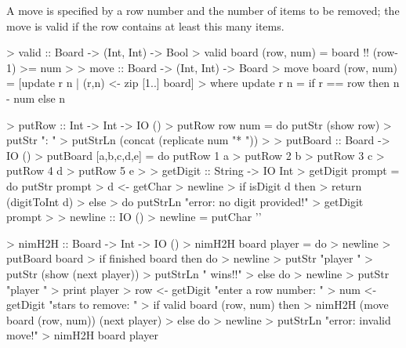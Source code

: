 \begin{impl}
A move is specified by a row number and the number of items to be removed; the move is valid if the row contains at least this many items.
\end{impl}
\begin{haskellcode}

> valid :: Board -> (Int, Int) -> Bool
> valid board (row, num) = board !! (row-1) >= num
> 
> move :: Board -> (Int, Int) -> Board
> move board (row, num) = [update r n | (r,n) <- zip [1..] board]
>      where update r n = if r == row then n - num else n

\end{haskellcode}

\begin{impl}
\end{impl}
\begin{haskellcode}

> putRow :: Int -> Int -> IO ()
> putRow row num = do putStr (show row)
>                     putStr ": "
>                     putStrLn (concat (replicate num "* "))
> 
> putBoard :: Board -> IO ()
> putBoard [a,b,c,d,e] = do putRow 1 a
>                           putRow 2 b
>                           putRow 3 c
>                           putRow 4 d
>                           putRow 5 e
> 
> getDigit :: String -> IO Int
> getDigit prompt = do putStr prompt
>                      d <- getChar
>                      newline
>                      if isDigit d then
>                         return (digitToInt d)
>                      else 
>                         do putStrLn "error: no digit provided!"
>                            getDigit prompt
> 
> newline :: IO ()
> newline = putChar '\n'

\end{haskellcode}

\begin{impl}
\end{impl}
\begin{haskellcode}

> nimH2H :: Board -> Int -> IO ()
> nimH2H board player = do
>     newline
>     putBoard board
>     if finished board then do 
>         newline
>         putStr "player "
>         putStr (show (next player))
>         putStrLn " wins!!"
>     else do
>         newline
>         putStr "player "
>         print player
>         row <- getDigit "enter a row number: "
>         num <- getDigit "stars to remove: "
>         if valid board (row, num) then
>             nimH2H (move board (row, num)) (next player)
>         else do
>             newline
>             putStrLn "error: invalid move!"
>             nimH2H board player

\end{haskellcode}

